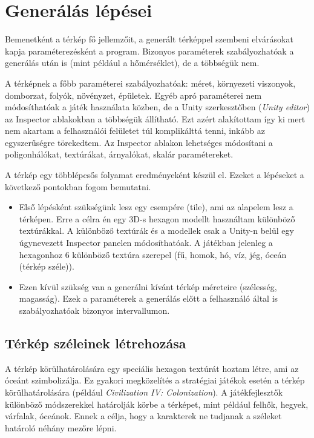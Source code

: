 \section{Generálás lépései}

Bemenetként a térkép fő jellemzőit, a generált térképpel szembeni elvárásokat kapja paraméterezésként a program. Bizonyos paraméterek szabályozhatóak a generálás után is (mint például a hőmérséklet), de a többségük nem.

A térképnek a főbb paraméterei szabályozhatóak: méret, környezeti viszonyok, domborzat, folyók, növényzet, épületek. Egyéb apró paraméterei nem módosíthatóak a játék használata közben, de a Unity szerkesztőben (\textit{Unity editor}) az Inspector ablakokban a többségük állítható. Ezt azért alakítottam így ki mert nem akartam a felhasználói felületet túl komplikálttá tenni, inkább az egyszerűségre törekedtem. Az Inspector ablakon lehetséges módosítani a poligonhálókat, textúrákat, árnyalókat, skalár paramétereket.

\newpage
A térkép egy többlépcsős folyamat eredményeként készül el. Ezeket a lépéseket a következő pontokban fogom bemutatni.
\begin{itemize}
\item Első lépésként szükségünk lesz egy csempére (tile), ami az alapelem lesz a térképen. Erre a célra én egy 3D-s hexagon modellt használtam különböző textúrákkal. A különböző textúrák és a modellek csak a Unity-n belül egy úgynevezett Inspector panelen módosíthatóak. A játékban jelenleg a hexagonhoz 6 különböző textúra szerepel (fű, homok, hó, víz, jég, óceán (térkép széle)).
\item Ezen kívül szükség van a generálni kívánt térkép méreteire (szélesség, magasság). Ezek a paraméterek a generálás előtt a felhasználó által is szabályozhatóak bizonyos intervallumon.
\end{itemize}

\subsection{Térkép széleinek létrehozása}

A térkép körülhatárolására egy speciális hexagon textúrát hoztam létre, ami az óceánt szimbolizálja. Ez gyakori megközelítés a stratégiai játékok esetén a térkép körülhatárolására (például \textit{Civilization IV: Colonization}). A játékfejlesztők különböző módszerekkel határolják körbe a térképet, mint például felhők, hegyek, várfalak, óceánok. Ennek a célja, hogy a karakterek ne tudjanak a széleket határoló néhány mezőre lépni.

